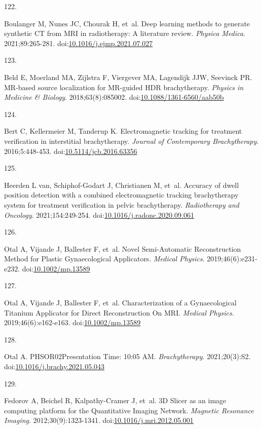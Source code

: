 \documentclass[
  a4paper,
]{scrreprt}
\newlength{\cslhangindent}
\newlength{\csllabelwidth}
\newlength{\cslentryspacingunit} %
\newenvironment{CSLReferences}[2] %
 {%
  \setlength{\parindent}{0pt}
  \ifodd #1
  \let\oldpar\par
  \def\par{\hangindent=\cslhangindent\oldpar}
  \fi
  \setlength{\parskip}{#2\cslentryspacingunit}
 }%
 {}
\newcommand{\CSLLeftMargin}[1]{\parbox[t]{\csllabelwidth}{#1}}
\newcommand{\CSLRightInline}[1]{\parbox[t]{\linewidth - \csllabelwidth}{#1}\break}
\begin{document}
\begin{CSLReferences}{0}{0}
\leavevmode{}%
\CSLLeftMargin{122. }%
\CSLRightInline{Boulanger M, Nunes JC, Chourak H, et~al. Deep learning
methods to generate synthetic CT from MRI in radiotherapy: A literature
review. \emph{Physica Medica}. 2021;89:265-281.
doi:\href{https://doi.org/10.1016/j.ejmp.2021.07.027}{10.1016/j.ejmp.2021.07.027}}

\leavevmode{}%
\CSLLeftMargin{123. }%
\CSLRightInline{Beld E, Moerland MA, Zijlstra F, Viergever MA, Lagendijk
JJW, Seevinck PR. MR-based source localization for MR-guided HDR
brachytherapy. \emph{Physics in Medicine \& Biology}. 2018;63(8):085002.
doi:\href{https://doi.org/10.1088/1361-6560/aab50b}{10.1088/1361-6560/aab50b}}

\leavevmode{}%
\CSLLeftMargin{124. }%
\CSLRightInline{Bert C, Kellermeier M, Tanderup K. Electromagnetic
tracking for treatment verification in interstitial brachytherapy.
\emph{Journal of Contemporary Brachytherapy}. 2016;5:448-453.
doi:\href{https://doi.org/10.5114/jcb.2016.63356}{10.5114/jcb.2016.63356}}

\leavevmode{}%
\CSLLeftMargin{125. }%
\CSLRightInline{Heerden L van, Schiphof-Godart J, Christianen M, et~al.
Accuracy of dwell position detection with a combined electromagnetic
tracking brachytherapy system for treatment verification in pelvic
brachytherapy. \emph{Radiotherapy and Oncology}. 2021;154:249-254.
doi:\href{https://doi.org/10.1016/j.radonc.2020.09.061}{10.1016/j.radonc.2020.09.061}}

\leavevmode{}%
\CSLLeftMargin{126. }%
\CSLRightInline{Otal A, Vijande J, Ballester F, et~al. Novel
Semi-Automatic Reconstruction Method for Plastic Gynaecological
Applicators. \emph{Medical Physics}. 2019;46(6):e231-e232.
doi:\href{https://doi.org/10.1002/mp.13589}{10.1002/mp.13589}}

\leavevmode{}%
\CSLLeftMargin{127. }%
\CSLRightInline{Otal A, Vijande J, Ballester F, et~al. Characterization
of a Gynaecological Titanium Applicator for Direct Reconstruction On
MRI. \emph{Medical Physics}. 2019;46(6):e162-e163.
doi:\href{https://doi.org/10.1002/mp.13589}{10.1002/mp.13589}}

\leavevmode{}%
\CSLLeftMargin{128. }%
\CSLRightInline{Otal A. PHSOR02{\hspace{1em}}Presentation Time: 10:05
AM. \emph{Brachytherapy}. 2021;20(3):S2.
doi:\href{https://doi.org/10.1016/j.brachy.2021.05.043}{10.1016/j.brachy.2021.05.043}}

\leavevmode{}%
\CSLLeftMargin{129. }%
\CSLRightInline{Fedorov A, Beichel R, Kalpathy-Cramer J, et~al. 3D
Slicer as an image computing platform for the Quantitative Imaging
Network. \emph{Magnetic Resonance Imaging}. 2012;30(9):1323-1341.
doi:\href{https://doi.org/10.1016/j.mri.2012.05.001}{10.1016/j.mri.2012.05.001}}

\end{CSLReferences}
\end{document}

